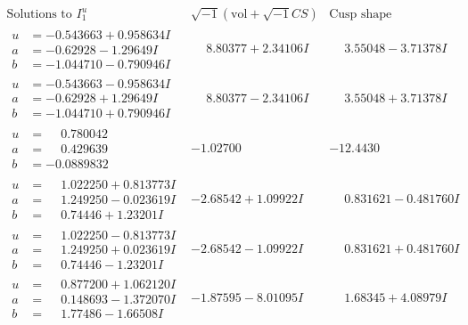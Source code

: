 \documentclass[1p]{elsarticle_modified}
\theoremstyle{definition}
\newcommand{\I}{\sqrt{-1}}
\begin{document}
$$\begin{array}{c|c|c}  
\text{Solutions to }I^u_{1}& \I (\text{vol} + \sqrt{-1}CS) & \text{Cusp shape}\\
 \hline 
\begin{aligned}
u &= -0.543663 + 0.958634 I \\
a &= -0.62928 - 1.29649 I \\
b &= -1.044710 - 0.790946 I\end{aligned}
 & \phantom{-}8.80377 + 2.34106 I & \phantom{-}3.55048 - 3.71378 I \\ \hline\begin{aligned}
u &= -0.543663 - 0.958634 I \\
a &= -0.62928 + 1.29649 I \\
b &= -1.044710 + 0.790946 I\end{aligned}
 & \phantom{-}8.80377 - 2.34106 I & \phantom{-}3.55048 + 3.71378 I \\ \hline\begin{aligned}
u &= \phantom{-}0.780042\phantom{ +0.000000I} \\
a &= \phantom{-}0.429639\phantom{ +0.000000I} \\
b &= -0.0889832\phantom{ +0.000000I}\end{aligned}
 & -1.02700\phantom{ +0.000000I} & -12.4430\phantom{ +0.000000I} \\ \hline\begin{aligned}
u &= \phantom{-}1.022250 + 0.813773 I \\
a &= \phantom{-}1.249250 - 0.023619 I \\
b &= \phantom{-}0.74446 + 1.23201 I\end{aligned}
 & -2.68542 + 1.09922 I & \phantom{-}0.831621 - 0.481760 I \\ \hline\begin{aligned}
u &= \phantom{-}1.022250 - 0.813773 I \\
a &= \phantom{-}1.249250 + 0.023619 I \\
b &= \phantom{-}0.74446 - 1.23201 I\end{aligned}
 & -2.68542 - 1.09922 I & \phantom{-}0.831621 + 0.481760 I \\ \hline\begin{aligned}
u &= \phantom{-}0.877200 + 1.062120 I \\
a &= \phantom{-}0.148693 - 1.372070 I \\
b &= \phantom{-}1.77486 - 1.66508 I\end{aligned}
 & -1.87595 - 8.01095 I & \phantom{-}1.68345 + 4.08979 I \\ \hline\begin{aligned}

\end{aligned}
\end{array}$$
\end{document}
